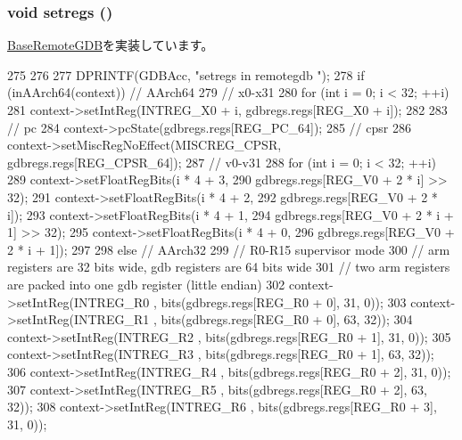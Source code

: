 \hypertarget{classArmISA_1_1RemoteGDB_a2051121b6bc93c8ca3856bbeeca7bdc1}{
\subsubsection[{setregs}]{\setlength{\rightskip}{0pt plus 5cm}void setregs ()}}
\label{classArmISA_1_1RemoteGDB_a2051121b6bc93c8ca3856bbeeca7bdc1}


\hyperlink{classBaseRemoteGDB_a6b0b51dc196f12756cc0ec49a3ae6a6a}{BaseRemoteGDB}を実装しています。


\begin{DoxyCode}
275 {
276 
277     DPRINTF(GDBAcc, "setregs in remotegdb \n");
278     if (inAArch64(context)) {  // AArch64
279         // x0-x31
280         for (int i = 0; i < 32; ++i) {
281             context->setIntReg(INTREG_X0 + i, gdbregs.regs[REG_X0 + i]);
282         }
283         // pc
284         context->pcState(gdbregs.regs[REG_PC_64]);
285         // cpsr
286         context->setMiscRegNoEffect(MISCREG_CPSR, gdbregs.regs[REG_CPSR_64]);
287         // v0-v31
288         for (int i = 0; i < 32; ++i) {
289           context->setFloatRegBits(i * 4 + 3,
290                                    gdbregs.regs[REG_V0 + 2 * i] >> 32);
291           context->setFloatRegBits(i * 4 + 2,
292                                    gdbregs.regs[REG_V0 + 2 * i]);
293           context->setFloatRegBits(i * 4 + 1,
294                                    gdbregs.regs[REG_V0 + 2 * i + 1] >> 32);
295           context->setFloatRegBits(i * 4 + 0,
296                                    gdbregs.regs[REG_V0 + 2 * i + 1]);
297         }
298     } else {  // AArch32
299         // R0-R15 supervisor mode
300         // arm registers are 32 bits wide, gdb registers are 64 bits wide
301         // two arm registers are packed into one gdb register (little endian)
302         context->setIntReg(INTREG_R0 , bits(gdbregs.regs[REG_R0 + 0], 31, 0));
303         context->setIntReg(INTREG_R1 , bits(gdbregs.regs[REG_R0 + 0], 63, 32));
304         context->setIntReg(INTREG_R2 , bits(gdbregs.regs[REG_R0 + 1], 31, 0));
305         context->setIntReg(INTREG_R3 , bits(gdbregs.regs[REG_R0 + 1], 63, 32));
306         context->setIntReg(INTREG_R4 , bits(gdbregs.regs[REG_R0 + 2], 31, 0));
307         context->setIntReg(INTREG_R5 , bits(gdbregs.regs[REG_R0 + 2], 63, 32));
308         context->setIntReg(INTREG_R6 , bits(gdbregs.regs[REG_R0 + 3], 31, 0));
}}
\end{DoxyCode}
